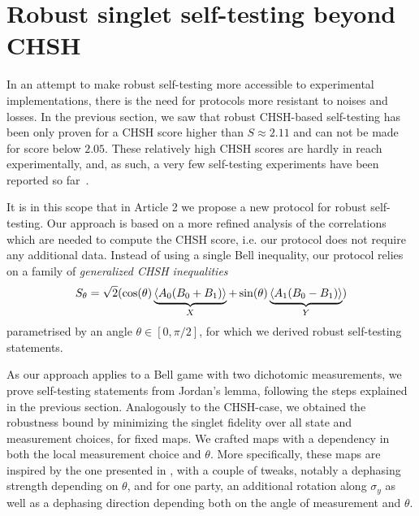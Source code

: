\section{Robust singlet self-testing beyond CHSH}
\label{sec:robust_XY}

In an attempt to make robust self-testing more accessible to experimental implementations, there is the need for protocols more resistant to noises and losses.
In the previous section, we saw that robust CHSH-based self-testing has been only proven for a CHSH score higher than $S\approx 2.11$ and can not be made for score below $2.05$.
These relatively high CHSH scores are hardly in reach experimentally, and, as such, a very few self-testing experiments have been reported so far~\cite{Tan2017,Bancal2021}.

It is in this scope that in Article 2 we propose a new protocol for robust self-testing.
Our approach is based on a more refined analysis of the correlations which are needed to compute the CHSH score, i.e. our protocol does not require any additional data.
Instead of using a single Bell inequality, our protocol relies on a family of \textit{generalized CHSH inequalities}
\begin{equation}
	S_\theta = \sqrt{2}(\cos(\theta) \underbrace{\langle {A_0(B_0+B_1)} \rangle}_{X} + \sin(\theta)\underbrace{\langle {A_1(B_0-B_1)} \rangle}_{Y})
	\label{eq:generalized_CHSH}
\end{equation}
parametrised by an angle $\theta \in [0,\pi/2]$, for which we derived robust self-testing statements.

As our approach applies to a Bell game with two dichotomic measurements, we prove self-testing statements from Jordan's lemma, following the steps explained in the previous section. 
Analogously to the CHSH-case, we obtained the robustness bound by minimizing the singlet fidelity over all state and measurement choices, for fixed maps.
We crafted maps with a dependency in both the local measurement choice and $\theta$.
More specifically, these maps are inspired by the one presented in , with a couple of tweaks, notably a dephasing strength depending on $\theta$, and for one party, an additional rotation along $\sigma_y$ as well as a dephasing direction depending both on the angle of measurement and $\theta$.

